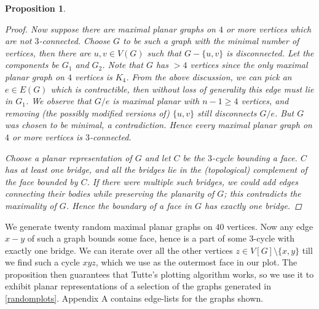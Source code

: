 \documentclass[12pt]{article}
\newtheorem*{prop}{Proposition}
\begin{document}
\begin{prop}
\begin{proof}
        Now suppose there are maximal planar graphs on \(4\) or more vertices
        which are not \(3\)-connected. Choose \(G\) to be such a graph with the
        minimal number of vertices, then there are \(u,v\in V(G)\) such that
        \(G-\{u,v\}\) is disconnected. Let the components be \(G_1\) and
        \(G_2\). Note that \(G\) has \(>4\) vertices since the only maximal
        planar graph on \(4\) vertices is \(K_4\). From the above discussion, we
        can pick an \(e\in E(G)\)
        which is contractible, then without loss of generality this edge must
        lie in \(G_1\). We observe that \(G/e\) is maximal planar with \(n-1\geq
        4\)
        vertices, and removing (the possibly modified versions of) \(\{u,v\}\)
        still disconnects \(G/e\). But \(G\) was chosen to be minimal, a
        contradiction. Hence every maximal planar graph on \(4\) or more
        vertices is \(3\)-connected.

        Choose a planar representation of \(G\) and let \(C\) be the \(3\)-cycle
        bounding a face. \(C\) has at least one bridge, and all the bridges lie
        in the (topological) complement of the face bounded by \(C\). If there
        were multiple such bridges, we could add edges connecting their bodies
        while preserving the planarity of \(G\); this contradicts the maximality
        of \(G\). Hence the boundary of a face in \(G\) has exactly one bridge.
    \end{proof}
\end{prop}

We generate twenty random maximal
planar graphs on \(40\) vertices. Now any edge \(x-y\) of such a graph bounds some face,
hence is a part of some \(3\)-cycle with exactly one bridge. We can iterate over
all the other vertices \(z\in V[G]\setminus \{x,y\}\) till we find such a cycle
\(xyz\), which we use as the outermost face in our plot. The proposition then
guarantees that Tutte's plotting algorithm works, so we use it to exhibit
planar representations of a selection of the graphs generated in
\cref{randomplots}. Appendix A contains edge-lists for the graphs shown.
\end{document}
